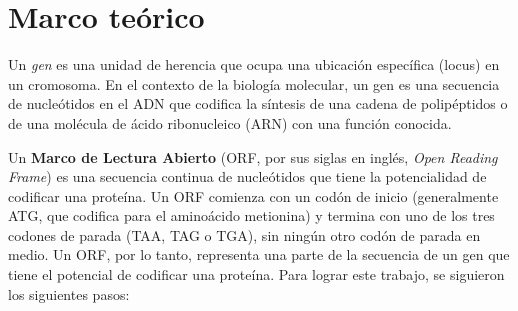 \section*{Marco teórico} %
\label{sec:marco_teorico} %

Un \textit{gen} es una unidad de herencia que ocupa una ubicación específica (locus) en un cromosoma. En el contexto de la biología molecular, un gen es una secuencia de nucleótidos en el ADN que codifica la síntesis de una cadena de polipéptidos o de una molécula de ácido ribonucleico (ARN) con una función conocida.

Un \textbf{Marco de Lectura Abierto} (ORF, por sus siglas en inglés, \textit{Open Reading Frame}) es una secuencia continua de nucleótidos que tiene la potencialidad de codificar una proteína. Un ORF comienza con un codón de inicio (generalmente ATG, que codifica para el aminoácido metionina) y termina con uno de los tres codones de parada (TAA, TAG o TGA), sin ningún otro codón de parada en medio. Un ORF, por lo tanto, representa una parte de la secuencia de un gen que tiene el potencial de codificar una proteína. Para lograr este trabajo, se siguieron los siguientes pasos:
